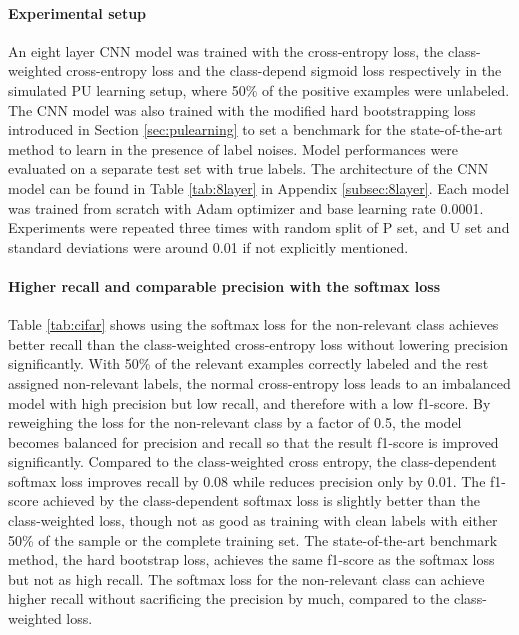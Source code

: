 \paragraph{Experimental setup}
An eight layer CNN model was trained with the cross-entropy loss, the class-weighted cross-entropy loss and the class-depend sigmoid loss respectively in the simulated PU learning setup, where 50\% of the positive examples were unlabeled.
The CNN model was also trained with the modified hard bootstrapping loss introduced in Section \ref{sec:pulearning} to set a benchmark for the state-of-the-art method to learn in the presence of label noises.
Model performances were evaluated on a separate test set with true labels.
The architecture of the CNN model can be found in Table \ref{tab:8layer} in Appendix \ref{subsec:8layer}.
Each model was trained from scratch with Adam optimizer and base learning rate 0.0001.
Experiments were repeated three times with random split of P set, and U set and standard deviations were around 0.01 if not explicitly mentioned.


\paragraph{Higher recall and comparable precision with the softmax loss}

Table \ref{tab:cifar} shows using the softmax loss for the non-relevant class achieves better recall than the class-weighted cross-entropy loss without lowering precision significantly.
With 50\% of the relevant examples correctly labeled and the rest assigned non-relevant labels, the normal cross-entropy loss leads to an imbalanced model with high precision but low recall, and therefore with a low f1-score.
By reweighing the loss for the non-relevant class by a factor of 0.5, the model becomes balanced for precision and recall so that the result f1-score is improved significantly.
Compared to the class-weighted cross entropy, the class-dependent softmax loss improves recall by 0.08 while reduces precision only by 0.01.
The f1-score achieved by the class-dependent softmax loss is slightly better than the class-weighted loss, though not as good as training with clean labels with either 50\% of the sample or the complete training set.
The state-of-the-art benchmark method, the hard bootstrap loss, achieves the same f1-score as the softmax loss but not as high recall.
The softmax loss for the non-relevant class can achieve higher recall without sacrificing the precision by much, compared to the class-weighted loss.

